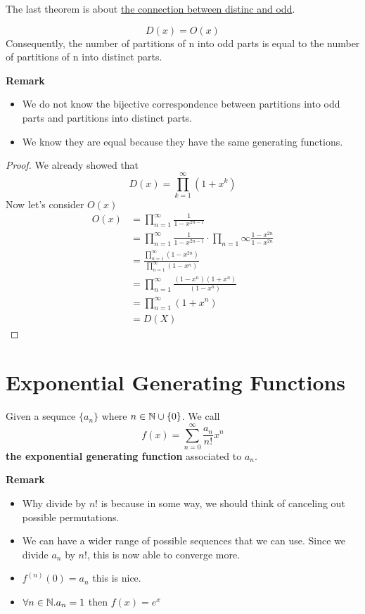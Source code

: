 \noindent The last theorem is about \underline{the connection between distinc and odd}.
\begin{theorem}
    $$D(x)=O(x)$$
    Consequently, the number of partitions of n into odd parts is equal to the number of partitions of n into distinct parts.
\end{theorem}
\textbf{Remark}
\begin{itemize}
    \item We do not know the bijective correspondence between partitions into odd parts and partitions into distinct parts.
    \item We know they are equal because they have the same generating functions.
\end{itemize}
\begin{proof}
    We already showed that $$D(x)=\prod_{k=1}^{\infty}(1+x^k)$$
    Now let's consider $O(x)$
    \begin{equation}
        \begin{split}
            O(x) &= \prod_{n=1}^{\infty}\frac{1}{1-x^{2n-1}}\\
            &= \prod_{n=1}^{\infty}\frac{1}{1-x^{2n-1}} \cdot \prod_{n=1}{\infty}\frac{1-x^{2n}}{1-x^{2n}}\\
            &= \frac{\prod_{n=1}^{\infty}(1-x^{2n})}{\prod_{n=1}^{\infty}(1-x^n)}\\
            &= \prod_{n=1}^{\infty}\frac{(1-x^n)(1+x^n)}{(1-x^n)}\\
            &= \prod_{n=1}^{\infty}(1+x^n)\\
            &= D(X)
        \end{split}
    \end{equation}
\end{proof}


\section{Exponential Generating Functions}

\begin{definition}
    Given a sequnce $\{a_n\}$ where $n \in \mathbb{N} \cup \{0\}$. We call $$f(x)=\sum_{n=0}^{\infty}\frac{a_n}{n!}x^n$$ \textbf{the exponential generating function} associated to $a_n$.
\end{definition}
\textbf{Remark}
\begin{itemize}
    \item Why divide by $n!$ is because in some way, we should think of canceling out possible permutations.
    \item We can have a wider range of possible sequences that we can use. Since we divide $a_n$ by $n!$, this is now able to converge more.
    \item $f^{(n)}(0)=a_n$ this is nice.
    \item $\forall n \in \mathbb{N}.a_n=1$ then $f(x)=e^x$
\end{itemize}


